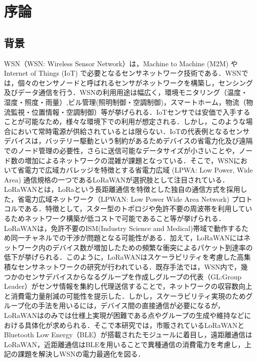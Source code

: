 \chapter{序論}

\section{背景}
WSN（WSN: Wireless Sensor Network）は，Machine to Machine (M2M) やInternet of Things (IoT) で必要となるセンサネットワーク技術である．WSNでは，個々のセンサノードと呼ばれるセンサがネットワークを構築し，センシング及びデータ通信を行う．WSNの利用用途は幅広く，環境モニタリング（温度・湿度・照度・雨量）,ビル管理(照明制御・空調制御)，スマートホーム，物流（物流監視・位置情報・空調制御）等が挙げられる\cite{Farooq2018}．IoTセンサでは安価で入手することが可能なため，様々な環境下での利用が想定される．しかし，このような場合において常時電源が供給されているとは限らない．IoTの代表例となるセンサデバイスは，バッテリー駆動という制約があるためデバイスの省電力化及び遠隔でのノード管理の必要性，さらに送信可能なデータサイズが小さいことや，ノード数の増加によるネットワークの混雑が課題となっている．そこで，WSNにおいて省電力で広域カバレッジを特徴とする省電力広域 (LPWA: Low Power, Wide Area) 通信規格の一つであるLoRaWANが選択肢として注目されている．
LoRaWANとは，LoRaという長距離通信を特徴とした独自の通信方式を採用した，省電力広域ネットワーク（LPWAN: Low Power Wide Area Network) プロトコルである．特徴として，スター型のトポロジや免許不要の周波帯を利用しているためネットワーク構築が低コストで可能であること等が挙げられる．LoRaWANは，免許不要のISM(Industry Science and Medical)帯域で動作するため同一チャネルでの干渉が問題となる可能性がある\cite{Adelantado2017}．加えて，LoRaWANにはネットワーク内のデバイス数が増加したための頻繁な衝突によるパケット到達率の低下が挙げられる\cite{Adelantado2017}．このように，LoRaWANはスケーラビリティを考慮した高集積なセンサネットワークの研究が行われている．既存手法\cite{2017}では，WSN内で，幾つかのセンサデバイスからなるグループを作成しグループの代表（GL:Group Leader）がセンサ情報を集約し代理送信することで，ネットワークの収容数向上と消費電力量削減の可能性を提示した．しかし，スケーラビリティ実現のためグループ化の手法を用いるには，デバイス間の直接通信が必要になるが，LoRaWANはのみでは仕様上実現が困難である点やグループの生成や維持などにおける具体化が求められる．そこで本研究では，市販されているLoRaWANとBluetooth Low Energy（BLE）が搭載されたモジュールに着目し，遠距離通信はLoRaWAN，近距離通信はBLEを用いることで異種通信の消費電力を考慮し，上記の課題を解決しWSNの電力最適化を図る．

